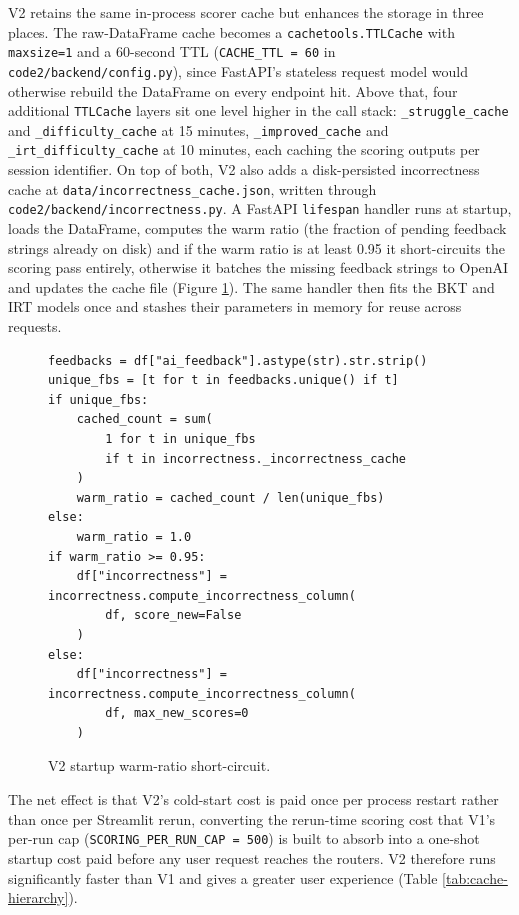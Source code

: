V2 retains the same in-process scorer cache but enhances the storage in three places.
The raw-DataFrame cache becomes a \texttt{cachetools.TTLCache} with \texttt{maxsize=1} and a 60-second TTL (\texttt{CACHE\_TTL = 60} in \texttt{code2/backend/config.py}), since FastAPI's stateless request model would otherwise rebuild the DataFrame on every endpoint hit.
Above that, four additional \texttt{TTLCache} layers sit one level higher in the call stack: \texttt{\_struggle\_cache} and \texttt{\_difficulty\_cache} at 15 minutes, \texttt{\_improved\_cache} and \texttt{\_irt\_difficulty\_cache} at 10 minutes, each caching the scoring outputs per session identifier.
On top of both, V2 also adds a disk-persisted incorrectness cache at \texttt{data/incorrectness\_cache.json}, written through \texttt{code2/backend/incorrectness.py}.
A FastAPI \texttt{lifespan} handler runs at startup, loads the DataFrame, computes the warm ratio (the fraction of pending feedback strings already on disk) and if the warm ratio is at least 0.95 it short-circuits the scoring pass entirely, otherwise it batches the missing feedback strings to OpenAI and updates the cache file (Figure \ref{fig:code-warmratio}).
The same handler then fits the BKT and IRT models once and stashes their parameters in memory for reuse across requests.

\begin{figure}[H]
    \centering
    \begin{minipage}{0.92\linewidth}
\begin{lstlisting}[firstnumber=94]
feedbacks = df["ai_feedback"].astype(str).str.strip()
unique_fbs = [t for t in feedbacks.unique() if t]
if unique_fbs:
    cached_count = sum(
        1 for t in unique_fbs
        if t in incorrectness._incorrectness_cache
    )
    warm_ratio = cached_count / len(unique_fbs)
else:
    warm_ratio = 1.0
if warm_ratio >= 0.95:
    df["incorrectness"] = incorrectness.compute_incorrectness_column(
        df, score_new=False
    )
else:
    df["incorrectness"] = incorrectness.compute_incorrectness_column(
        df, max_new_scores=0
    )
\end{lstlisting}
    \end{minipage}
    \caption{V2 startup warm-ratio short-circuit.}
    \label{fig:code-warmratio}
\end{figure}

The net effect is that V2's cold-start cost is paid once per process restart rather than once per Streamlit rerun, converting the rerun-time scoring cost that V1's per-run cap (\texttt{SCORING\_PER\_RUN\_CAP = 500}) is built to absorb into a one-shot startup cost paid before any user request reaches the routers. V2 therefore runs significantly faster than V1 and gives a greater user experience (Table \ref{tab:cache-hierarchy}).

